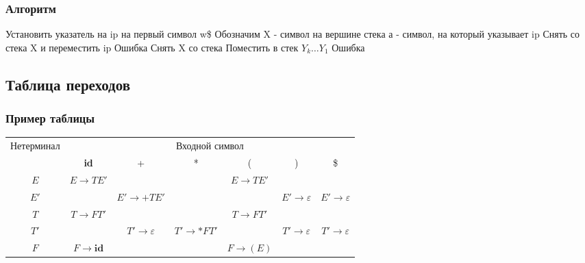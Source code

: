 \documentclass[16pt,pdf,unicode]{beamer}
\begin{document}
\begin{frame}
\frametitle{Алгоритм}
\begin{algorithmic}
\small
\State Установить указатель на ip на первый символ w\$
\Repeat 
  \State Обозначим X - символ на вершине стека
  \State а - символ, на который указывает ip
      \State Снять со стека X и переместить ip
    \Else
      \State Ошибка
    \EndIf
  \Else
      \State Снять X со стека
      \State Поместить в стек $Y_k\dots Y_1$
    \Else
      \State Ошибка
    \EndIf
  \EndIf  


\end{algorithmic}
\end{frame}

\subsection{Таблица переходов}
\begin{frame}
\frametitle{Пример таблицы}
\begin{center}
	\begin{scriptsize}
		\begin{tabular}{c | c | c | c | c | c | c}
			\hline
			\multirow{2}{*}{Нетерминал} & \multicolumn{6}{|c}{Входной символ} \\
			\cline{2-7}
			& \textbf{id} & + & * & ( & ) & \$\\
			\hline
			$E$ & $E \rightarrow TE'$ & & & $E \rightarrow TE'$ & & \\
			$E'$ & & $E' \rightarrow +TE'$ & & & $E' \rightarrow \varepsilon$ & $E' \rightarrow \varepsilon$\\
			$T$ & $T \rightarrow FT'$ & & & $T \rightarrow FT'$ & & \\
			$T'$ & & $T' \rightarrow \varepsilon$ & $T' \rightarrow *FT'$ & & $T' \rightarrow \varepsilon$ & $T' \rightarrow \varepsilon$\\
			$F$ & $F \rightarrow \textbf{id}$ & & & $F \rightarrow (E)$ & & \\
			\hline
		\end{tabular}
	\end{scriptsize}
\end{center}
\end{frame}
\end{document}
